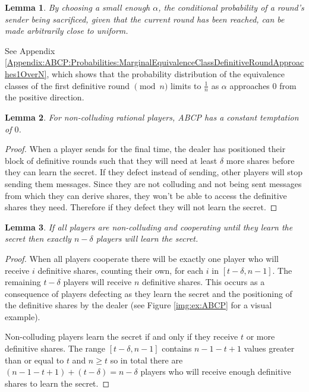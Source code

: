 \documentclass[12pt]{dalcsthesis}
\newtheorem{lemma}{Lemma}
\begin{document}
\begin{lemma}\label{Lem:ABCP:FairerDuringWithSmallAlpha}By choosing a small enough $\alpha$, the conditional probability of a round's sender being sacrificed, given that the current round has been reached, can be made arbitrarily close to uniform.\end{lemma}
See Appendix \ref{Appendix:ABCP:Probabilities:MarginalEquivalenceClassDefinitiveRoundApproaches1OverN}, which shows that the probability distribution of the equivalence classes of the first definitive round $\pmod{n}$ limits to $\frac{1}{n}$ as $\alpha$ approaches $0$ from the positive direction.

\begin{lemma}\label{Lem:ABCP:SoloTemptNone}For non-colluding rational players, ABCP has a constant temptation of $0$.\end{lemma}
\begin{proof}
When a player sends for the final time, the dealer has positioned their block of definitive rounds such that they will need at least $\delta$ more shares before they can learn the secret. If they defect instead of sending, other players will stop sending them messages. Since they are not colluding and not being sent messages from which they can derive shares, they won't be able to access the definitive shares they need. Therefore if they defect they will not learn the secret.
\end{proof}

\begin{lemma}\label{Lem:ABCP:AllDeltaLose}If all players are non-colluding and cooperating until they learn the secret then exactly $n-\delta$ players will learn the secret.\end{lemma}
\begin{proof}
When all players cooperate there will be exactly one player who will receive $i$ definitive shares, counting their own, for each $i$ in $[t-\delta, n-1]$. The remaining $t-\delta$ players will receive $n$ definitive shares. This occurs as a consequence of players defecting as they learn the secret and the positioning of the definitive shares by the dealer (see Figure \ref{img:ex:ABCP} for a visual example).

Non-colluding players learn the secret if and only if they receive $t$ or more definitive shares. The range $[t-\delta, n-1]$ contains $n-1-t+1$ values greater than or equal to $t$ and $n \geq t$ so in total there are $(n-1-t+1) + (t-\delta) = n-\delta$ players who will receive enough definitive shares to learn the secret.
\end{proof}
\end{document}
